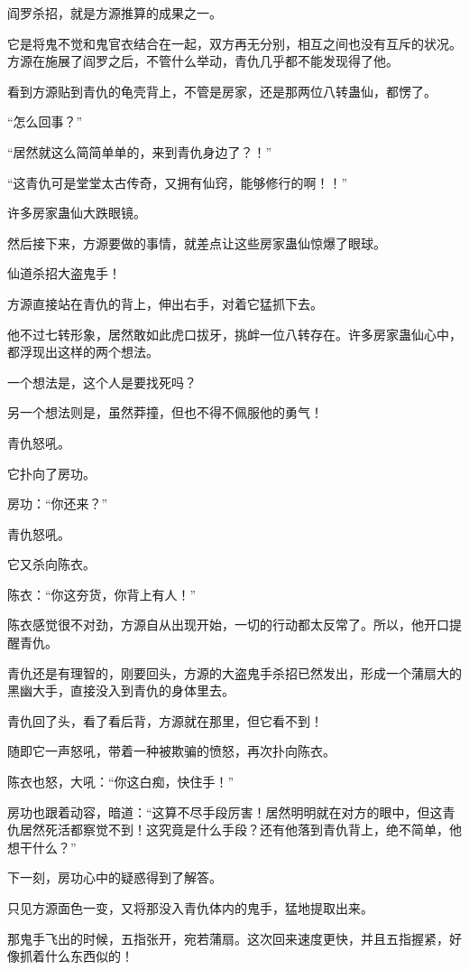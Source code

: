 \begin{this_body}
阎罗杀招，就是方源推算的成果之一。

它是将鬼不觉和鬼官衣结合在一起，双方再无分别，相互之间也没有互斥的状况。方源在施展了阎罗之后，不管什么举动，青仇几乎都不能发现得了他。

看到方源贴到青仇的龟壳背上，不管是房家，还是那两位八转蛊仙，都愣了。

“怎么回事？”

“居然就这么简简单单的，来到青仇身边了？！”

“这青仇可是堂堂太古传奇，又拥有仙窍，能够修行的啊！！”

许多房家蛊仙大跌眼镜。

然后接下来，方源要做的事情，就差点让这些房家蛊仙惊爆了眼球。

仙道杀招大盗鬼手！

方源直接站在青仇的背上，伸出右手，对着它猛抓下去。

他不过七转形象，居然敢如此虎口拔牙，挑衅一位八转存在。许多房家蛊仙心中，都浮现出这样的两个想法。

一个想法是，这个人是要找死吗？

另一个想法则是，虽然莽撞，但也不得不佩服他的勇气！

青仇怒吼。

它扑向了房功。

房功：“你还来？”

青仇怒吼。

它又杀向陈衣。

陈衣：“你这夯货，你背上有人！”

陈衣感觉很不对劲，方源自从出现开始，一切的行动都太反常了。所以，他开口提醒青仇。

青仇还是有理智的，刚要回头，方源的大盗鬼手杀招已然发出，形成一个蒲扇大的黑幽大手，直接没入到青仇的身体里去。

青仇回了头，看了看后背，方源就在那里，但它看不到！

随即它一声怒吼，带着一种被欺骗的愤怒，再次扑向陈衣。

陈衣也怒，大吼：“你这白痴，快住手！”

房功也跟着动容，暗道：“这算不尽手段厉害！居然明明就在对方的眼中，但这青仇居然死活都察觉不到！这究竟是什么手段？还有他落到青仇背上，绝不简单，他想干什么？”

下一刻，房功心中的疑惑得到了解答。

只见方源面色一变，又将那没入青仇体内的鬼手，猛地提取出来。

那鬼手飞出的时候，五指张开，宛若蒲扇。这次回来速度更快，并且五指握紧，好像抓着什么东西似的！


\end{this_body}
